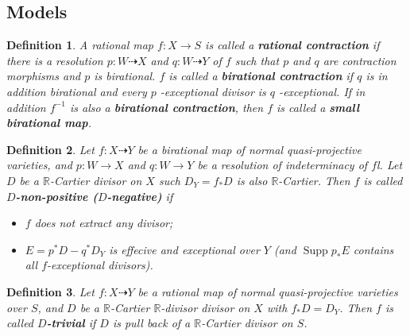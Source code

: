 \documentclass{article}
\newtheorem{defn}{Definition}[subsection]
\begin{document}
\subsection{Models}
\begin{defn}
  \cite[2.Notation and Conventions]{haconSarkisovProgram2011} A rational map $f:X\to S$ is called a \textbf{rational contraction} if there is a resolution $p:W\dashrightarrow X$  and $q:W\dashrightarrow Y$  of $f$  such that $p$  and $q$  are contraction morphisms and $p$  is birational. $f$ is called a \textbf{birational contraction} if $q$  is in addition birational and every $p$ -exceptional divisor is $q$ -exceptional. If in addition $f^{-1}$ is also a \textbf{birational contraction}, then $f$ is called a \textbf{small birational map}.
\end{defn}

\begin{defn}\label{negativemap}
  \cite[Definition 3.6.1]{birkarExistenceMinimalModels2009}Let $f:X\dashrightarrow Y$ be a birational map of normal quasi-projective varieties, and $p:W\to X$ and $q:W\to Y$ be a resolution of indeterminacy of $f$l. Let $D$ be a $\mathbb{R}$-Cartier divisor on $X$ such  $D_{Y}=f_*D$ is  also $\mathbb{R}$-Cartier. Then $f$ is called \textbf{$D$-non-positive ($D$-negative)} if
\begin{itemize}
  \item $f$ does not extract any divisor;
  \item $E=p^{*}D-q^*D_Y$ is effecive and exceptional over $Y$ (and $\operatorname{Supp}p_*E$ contains all $f$-exceptional divisors).
\end{itemize}
\end{defn}
\begin{defn}\label{trivialmap}
  \cite[13.2.Notation and conventions]{haconMinimalModelProgram2012} Let $f:X\dashrightarrow Y$ be a rational map of normal quasi-projective varieties over $S$, and $D$ be a $\mathbb{R}$-Cartier $\mathbb{R}$-divisor divisor on $X$ with $f_*D=D_Y$. Then $f$ is called \textbf{$D$-trivial} if $D$ is pull back of a $\mathbb{R}$-Cartier divisor on $S$.
\end{defn}
\end{document}
